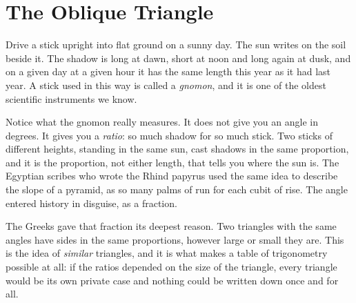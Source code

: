 \chapter{The Oblique Triangle}\label{ch:oblique}



Drive a stick upright into flat ground on a sunny day. The sun writes on the soil beside it. The shadow is long at dawn, short at noon and long again at dusk, and on a given day at a given hour it has the same length this year as it had last year. A stick used in this way is called a \emph{gnomon}, and it is one of the oldest scientific instruments we know.

Notice what the gnomon really measures. It does not give you an angle in degrees. It gives you a \emph{ratio}: so much shadow for so much stick. Two sticks of different heights, standing in the same sun, cast shadows in the same proportion, and it is the proportion, not either length, that tells you where the sun is. The Egyptian scribes who wrote the Rhind papyrus used the same idea to describe the slope of a pyramid, as so many palms of run for each cubit of rise. The angle entered history in disguise, as a fraction.

The Greeks gave that fraction its deepest reason. Two triangles with the same angles have sides in the same proportions, however large or small they are. This is the idea of \emph{similar} triangles, and it is what makes a table of trigonometry possible at all: if the ratios depended on the size of the triangle, every triangle would be its own private case and nothing could be written down once and for all.

